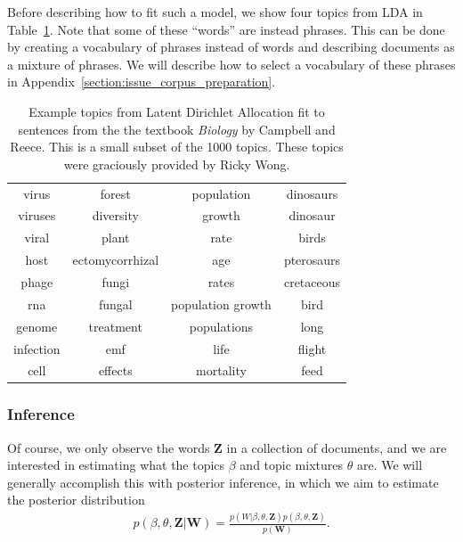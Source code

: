 Before describing how to fit such a model, we show four
topics from LDA in Table~\ref{table:example_lda_topics}.  Note that some
of these ``words'' are instead phrases.  This can be done by creating
a vocabulary of phrases instead of words and describing documents as a
mixture of phrases.  We will describe how to select a vocabulary of these phrases in Appendix~\ref{section:issue_corpus_preparation}.
\begin{table}
  \caption{Example topics from Latent Dirichlet Allocation fit to sentences from the the textbook \emph{Biology} by Campbell and Reece.  This is a small subset of the 1000 topics. These topics were graciously provided by Ricky Wong.}
  \center  \begin{tabular}{|c|c|c|c|}
    \hline
    virus & forest & population & dinosaurs \\
    viruses & diversity & growth & dinosaur \\
    viral & plant & rate & birds \\
    host & ectomycorrhizal & age & pterosaurs \\
    phage & fungi & rates & cretaceous \\
    rna & fungal & population growth & bird \\
    genome & treatment & populations & long \\
    infection & emf & life & flight \\
    cell & effects & mortality & feed \\
    \hline
  \end{tabular}
  \label{table:example_lda_topics}
\end{table}

\subsubsection{Inference}
Of course, we only observe the words $\bm Z$ in a collection of
documents, and we are interested in estimating what the topics $\beta$
and topic mixtures $\theta$ are.  We will generally accomplish this
with posterior inference, in which we aim to estimate the posterior
distribution
\begin{align}
  p(\beta, \theta, \bm Z | \bm W) = \frac{p(W | \beta, \theta, \bm Z) p(\beta, \theta, \bm Z)}{p(\bm W)}.
\end{align}

